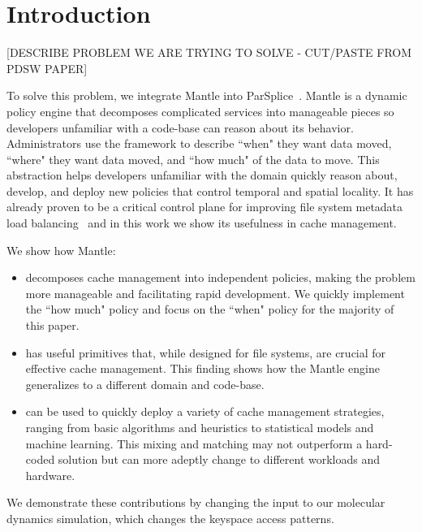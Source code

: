 \section{Introduction}

[DESCRIBE PROBLEM WE ARE TRYING TO SOLVE - CUT/PASTE FROM PDSW PAPER]

To solve this problem, we integrate Mantle into
ParSplice~\cite{perez:jctc20150parsplice}. Mantle is a dynamic policy engine
that decomposes complicated services into manageable pieces so developers
unfamiliar with a code-base can reason about its behavior. Administrators use
the framework to describe ``when" they want data moved, ``where" they want data
moved, and ``how much" of the data to move.  This abstraction helps developers
unfamiliar with the domain quickly reason about, develop, and deploy new
policies that control temporal and spatial locality. It has already proven to
be a critical control plane for improving file system metadata load
balancing~\cite{sevilla:sc15-mantle} and in this work we show its usefulness in
cache management.

We show how Mantle:
\begin{itemize}

  \item decomposes cache management into independent policies, making the
  problem more manageable and facilitating rapid development. We quickly implement
  the ``how much" policy and focus on the ``when" policy for the majority of this paper.

  \item has useful primitives that, while designed for file systems, are
  crucial for effective cache management. This finding shows how the Mantle
  engine generalizes to a different domain and code-base.

  \item can be used to quickly deploy a variety of cache management strategies,
  ranging from basic algorithms and heuristics to statistical models and machine
  learning. This mixing and matching may not outperform a hard-coded solution but
  can more adeptly change to different workloads and hardware. 

\end{itemize}

We demonstrate these contributions by changing the input to our molecular
dynamics simulation, which changes the keyspace access patterns. 




